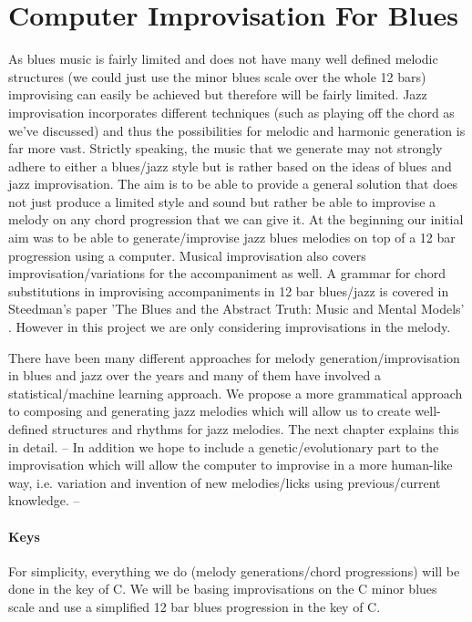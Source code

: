 \documentclass[pdftex,12pt,a4paper]{report}
\begin{document}
\section{Computer Improvisation For Blues}
As blues music is fairly limited and does not have many well defined melodic structures (we could just use the minor blues scale over the whole 12 bars) improvising can easily be achieved but therefore will be fairly limited. Jazz improvisation incorporates different techniques (such as playing off the chord as we've discussed) and thus the possibilities for melodic and harmonic generation is far more vast. Strictly speaking, the music that we generate may not strongly adhere to either a blues/jazz style but is rather based on the ideas of blues and jazz improvisation. The aim is to be able to provide a general solution that does not just produce a limited style and sound but rather be able to improvise a melody on any chord progression that we can give it. At the beginning our initial aim was to be able to generate/improvise jazz blues melodies on top of a 12 bar progression using a computer. Musical improvisation also covers improvisation/variations for the accompaniment as well. A grammar for chord substitutions in improvising accompaniments in 12 bar blues/jazz is covered in Steedman's paper 'The Blues and the Abstract Truth: Music and Mental Models' \cite{steedman96}. However in this project we are only considering improvisations in the melody.

There have been many different approaches for melody generation/improvisation in blues and jazz over the years and many of them have involved a statistical/machine learning approach. We propose a more grammatical approach to composing and generating jazz melodies which will allow us to create well-defined structures and rhythms for jazz melodies. The next chapter explains this in detail. -- In addition we hope to include a genetic/evolutionary part to the improvisation which will allow the computer to improvise in a more human-like way, i.e. variation and invention of new melodies/licks using previous/current knowledge. --

\paragraph{Keys}
For simplicity, everything we do (melody generations/chord progressions) will be done in the key of C. We will be basing improvisations on the C minor blues scale and use a simplified 12 bar blues progression in the key of C.
\end{document}
